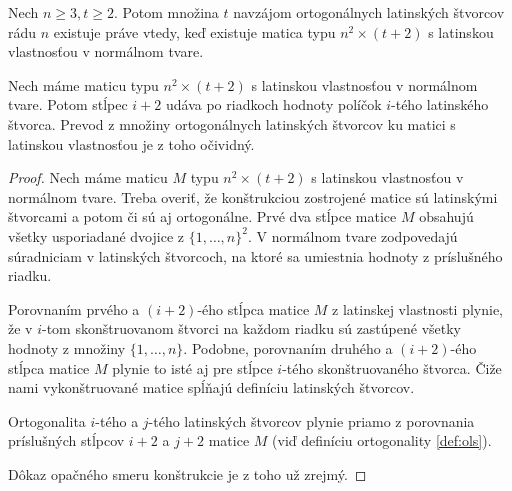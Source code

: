 \begin{lemma}
\label{lm:ols_lp}
Nech $n \geq 3, t \geq 2$. Potom množina $t$ navzájom ortogonálnych latinských štvorcov rádu $n$ existuje práve vtedy,
keď existuje matica typu $n^2 \times (t+2)$ s latinskou vlastnosťou v normálnom tvare.
\end{lemma}
\begin{construction}
Nech máme maticu typu $n^2 \times (t+2)$ s latinskou vlastnosťou v normálnom tvare.
Potom stĺpec $i+2$ udáva po riadkoch hodnoty políčok $i$-tého latinského štvorca.
Prevod z množiny ortogonálnych latinských štvorcov ku matici s latinskou vlastnosťou je z toho očividný.
\end{construction}
\begin{proof}
Nech máme maticu $M$ typu $n^2 \times (t+2)$ s latinskou vlastnosťou v normálnom tvare.
Treba overiť, že konštrukciou zostrojené matice sú latinskými štvorcami a potom či sú aj ortogonálne.
Prvé dva stĺpce matice $M$ obsahujú všetky usporiadané dvojice z $\{1, \ldots, n\}^2$.
V normálnom tvare zodpovedajú súradniciam v latinských štvorcoch, na ktoré sa umiestnia hodnoty z príslušného riadku.

Porovnaním prvého a $(i + 2)$-ého stĺpca matice $M$ z latinskej vlastnosti plynie, že v $i$-tom skonštruovanom štvorci na každom riadku sú zastúpené všetky hodnoty z množiny $\{1, \ldots, n\}$.
Podobne, porovnaním druhého a $(i + 2)$-ého stĺpca matice $M$ plynie to isté aj pre stĺpce $i$-tého skonštruovaného štvorca.
Čiže nami vykonštruované matice spĺňajú definíciu latinských štvorcov.

Ortogonalita $i$-tého a $j$-tého latinských štvorcov plynie priamo z porovnania príslušných stĺpcov $i+2$ a $j+2$ matice $M$ (viď definíciu ortogonality \ref{def:ols}).

Dôkaz opačného smeru konštrukcie je z toho už zrejmý.
\end{proof}

